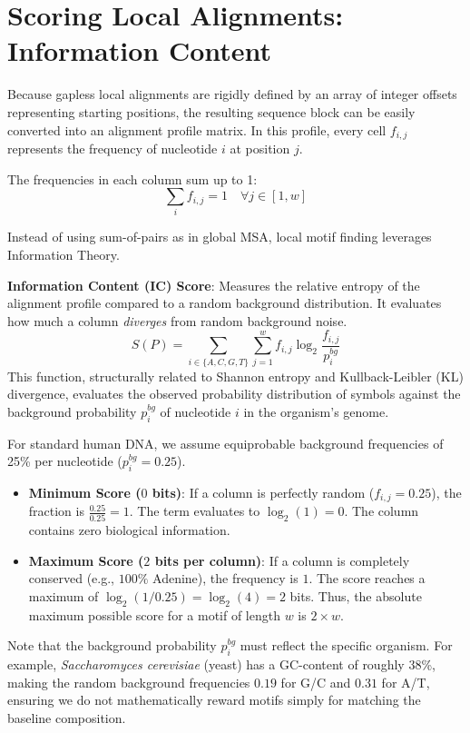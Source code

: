 \section{Scoring Local Alignments: Information Content}
Because gapless local alignments are rigidly defined by an array of integer offsets representing starting positions, the resulting sequence block can be easily converted into an alignment profile matrix. In this profile, every cell $f_{i,j}$ represents the frequency of nucleotide $i$ at position $j$.

The frequencies in each column sum up to 1:
\[ \sum_{i} f_{i,j} = 1 \quad \forall j \in [1,w] \]

Instead of using sum-of-pairs as in global MSA, local motif finding leverages Information Theory.

\begin{important}
\textbf{Information Content (IC) Score}: Measures the relative entropy of the alignment profile compared to a random background distribution. It evaluates how much a column \textit{diverges} from random background noise.
\[
  S(P) = \sum_{i \in \{A,C,G,T\}} \sum_{j=1}^w f_{i,j} \log_2 \frac{f_{i,j}}{p_i^{bg}}
\]
This function, structurally related to Shannon entropy and Kullback-Leibler (KL) divergence, evaluates the observed probability distribution of symbols against the background probability $p_i^{bg}$ of nucleotide $i$ in the organism's genome.
\end{important}

For standard human DNA, we assume equiprobable background frequencies of 25\% per nucleotide ($p_i^{bg} = 0.25$).
\begin{itemize}
    \item \textbf{Minimum Score ($0$ bits)}: If a column is perfectly random ($f_{i,j} = 0.25$), the fraction is $\frac{0.25}{0.25} = 1$. The term evaluates to $\log_2(1) = 0$. The column contains zero biological information.
    \item \textbf{Maximum Score ($2$ bits per column)}: If a column is completely conserved (e.g., $100\%$ Adenine), the frequency is $1$. The score reaches a maximum of $\log_2(1/0.25) = \log_2(4) = 2$ bits. Thus, the absolute maximum possible score for a motif of length $w$ is $2 \times w$.
\end{itemize}

\sta Note that the background probability $p_i^{bg}$ must reflect the specific organism. For example, \textit{Saccharomyces cerevisiae} (yeast) has a GC-content of roughly 38\%, making the random background frequencies $0.19$ for G/C and $0.31$ for A/T, ensuring we do not mathematically reward motifs simply for matching the baseline composition.

